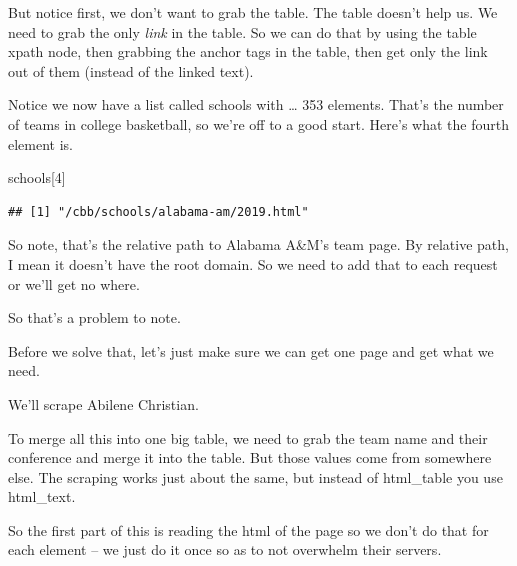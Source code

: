 \documentclass[]{book}
\newenvironment{Shaded}{\begin{snugshade}}{\end{snugshade}}
\newcommand{\DataTypeTok}[1]{\textcolor[rgb]{0.13,0.29,0.53}{#1}}
\newcommand{\DecValTok}[1]{\textcolor[rgb]{0.00,0.00,0.81}{#1}}
\newcommand{\KeywordTok}[1]{\textcolor[rgb]{0.13,0.29,0.53}{\textbf{#1}}}
\newcommand{\NormalTok}[1]{#1}
\newcommand{\OperatorTok}[1]{\textcolor[rgb]{0.81,0.36,0.00}{\textbf{#1}}}
\newcommand{\StringTok}[1]{\textcolor[rgb]{0.31,0.60,0.02}{#1}}
\begin{document}
But notice first, we don't want to grab the table. The table doesn't help us. We need to grab the only \emph{link} in the table. So we can do that by using the table xpath node, then grabbing the anchor tags in the table, then get only the link out of them (instead of the linked text).

\begin{Shaded}
\end{Shaded}

Notice we now have a list called schools with \ldots{} 353 elements. That's the number of teams in college basketball, so we're off to a good start. Here's what the fourth element is.

\begin{Shaded}
\begin{Highlighting}[]
\NormalTok{schools[}\DecValTok{4}\NormalTok{]}
\end{Highlighting}
\end{Shaded}

\begin{verbatim}
## [1] "/cbb/schools/alabama-am/2019.html"
\end{verbatim}

So note, that's the relative path to Alabama A\&M's team page. By relative path, I mean it doesn't have the root domain. So we need to add that to each request or we'll get no where.

So that's a problem to note.

Before we solve that, let's just make sure we can get one page and get what we need.

We'll scrape Abilene Christian.

To merge all this into one big table, we need to grab the team name and their conference and merge it into the table. But those values come from somewhere else. The scraping works just about the same, but instead of html\_table you use html\_text.

So the first part of this is reading the html of the page so we don't do that for each element -- we just do it once so as to not overwhelm their servers.
\end{document}
